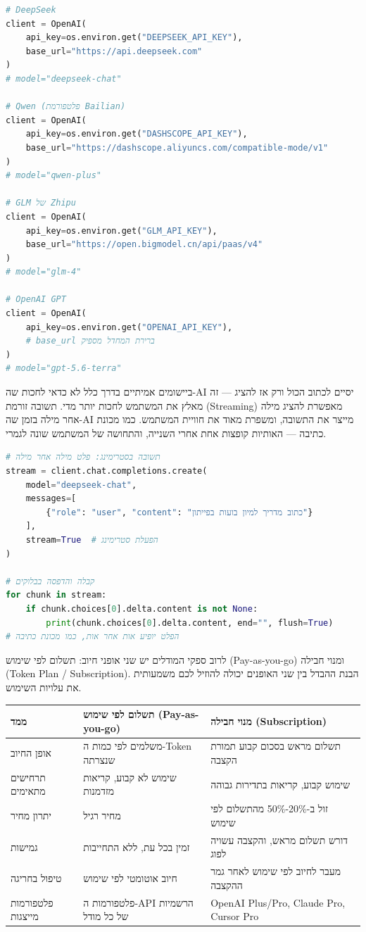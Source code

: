 \begin{lstlisting}[language=Python]
# DeepSeek
client = OpenAI(
    api_key=os.environ.get("DEEPSEEK_API_KEY"),
    base_url="https://api.deepseek.com"
)
# model="deepseek-chat"

# Qwen (פלטפורמת Bailian)
client = OpenAI(
    api_key=os.environ.get("DASHSCOPE_API_KEY"),
    base_url="https://dashscope.aliyuncs.com/compatible-mode/v1"
)
# model="qwen-plus"

# GLM של Zhipu
client = OpenAI(
    api_key=os.environ.get("GLM_API_KEY"),
    base_url="https://open.bigmodel.cn/api/paas/v4"
)
# model="glm-4"

# OpenAI GPT
client = OpenAI(
    api_key=os.environ.get("OPENAI_API_KEY"),
    # base_url ברירת המחדל מספיק
)
# model="gpt-5.6-terra"
\end{lstlisting}


ביישומים אמיתיים בדרך כלל לא כדאי לחכות שה-AI יסיים לכתוב הכול ורק אז להציג — זה מאלץ את המשתמש לחכות יותר מדי. תשובה זורמת (Streaming) מאפשרת להציג מילה אחר מילה בזמן שה-AI מייצר את התשובה, ומשפרת מאוד את חוויית המשתמש. כמו מכונת כתיבה — האותיות קופצות אחת אחרי השנייה, והתחושה של המשתמש שונה לגמרי.

\begin{lstlisting}[language=Python]
# תשובה בסטרימינג: פלט מילה אחר מילה
stream = client.chat.completions.create(
    model="deepseek-chat",
    messages=[
        {"role": "user", "content": "כתוב מדריך למיון בועות בפייתון"}
    ],
    stream=True  # הפעלת סטרימינג
)

# קבלה והדפסה בבלוקים
for chunk in stream:
    if chunk.choices[0].delta.content is not None:
        print(chunk.choices[0].delta.content, end="", flush=True)
# הפלט יופיע אות אחר אות, כמו מכונת כתיבה
\end{lstlisting}


לרוב ספקי המודלים יש שני אופני חיוב: תשלום לפי שימוש (Pay-as-you-go) ומנוי חבילה (Token Plan / Subscription). הבנת ההבדל בין שני האופנים יכולה להוזיל לכם משמעותית את עלויות השימוש.


\begin{center}
\begin{tabularx}{\linewidth}{|X|X|X|}
\hline
\textbf{ממד} & \textbf{תשלום לפי שימוש (Pay-as-you-go)} & \textbf{מנוי חבילה (Subscription)} \tabularnewline
\hline
אופן החיוב & משלמים לפי כמות ה-Token שנצרתה & תשלום מראש בסכום קבוע תמורת הקצבה \tabularnewline
תרחישים מתאימים & שימוש לא קבוע, קריאות מזדמנות & שימוש קבוע, קריאות בתדירות גבוהה \tabularnewline
יתרון מחיר & מחיר רגיל & זול ב-20\%-50\% מהתשלום לפי שימוש \tabularnewline
גמישות & זמין בכל עת, ללא התחייבות & דורש תשלום מראש, והקצבה עשויה לפוג \tabularnewline
טיפול בחריגה & חיוב אוטומטי לפי שימוש & מעבר לחיוב לפי שימוש לאחר גמר ההקצבה \tabularnewline
פלטפורמות מייצגות & פלטפורמות ה-API הרשמיות של כל מודל & OpenAI Plus/Pro, Claude Pro, Cursor Pro \tabularnewline
\hline
\end{tabularx}
\end{center}

